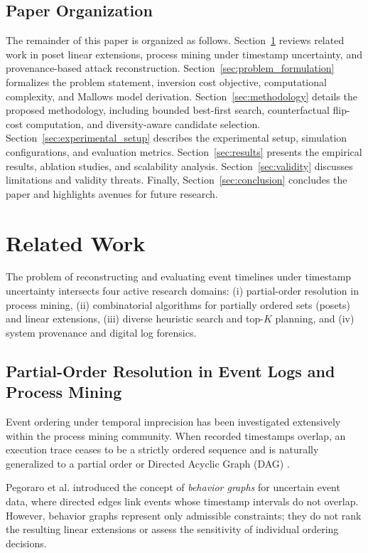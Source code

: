\documentclass[journal]{IEEEtran}
\begin{document}
\subsection{Paper Organization}
The remainder of this paper is organized as follows. Section~\ref{sec:related_work} reviews related work in poset linear extensions, process mining under timestamp uncertainty, and provenance-based attack reconstruction. Section~\ref{sec:problem_formulation} formalizes the problem statement, inversion cost objective, computational complexity, and Mallows model derivation. Section~\ref{sec:methodology} details the proposed methodology, including bounded best-first search, counterfactual flip-cost computation, and diversity-aware candidate selection. Section~\ref{sec:experimental_setup} describes the experimental setup, simulation configurations, and evaluation metrics. Section~\ref{sec:results} presents the empirical results, ablation studies, and scalability analysis. Section~\ref{sec:validity} discusses limitations and validity threats. Finally, Section~\ref{sec:conclusion} concludes the paper and highlights avenues for future research.

\section{Related Work}
\label{sec:related_work}

The problem of reconstructing and evaluating event timelines under timestamp uncertainty intersects four active research domains: (i) partial-order resolution in process mining, (ii) combinatorial algorithms for partially ordered sets (posets) and linear extensions, (iii) diverse heuristic search and top-$K$ planning, and (iv) system provenance and digital log forensics.

\subsection{Partial-Order Resolution in Event Logs and Process Mining}
Event ordering under temporal imprecision has been investigated extensively within the process mining community. When recorded timestamps overlap, an execution trace ceases to be a strictly ordered sequence and is naturally generalized to a partial order or Directed Acyclic Graph (DAG) \cite{vanderAa2020, Pegoraro2020a}.

Pegoraro et al. \cite{Pegoraro2020a, Pegoraro2020b} introduced the concept of \emph{behavior graphs} for uncertain event data, where directed edges link events whose timestamp intervals do not overlap. However, behavior graphs represent only admissible constraints; they do not rank the resulting linear extensions or assess the sensitivity of individual ordering decisions.
\end{document}

